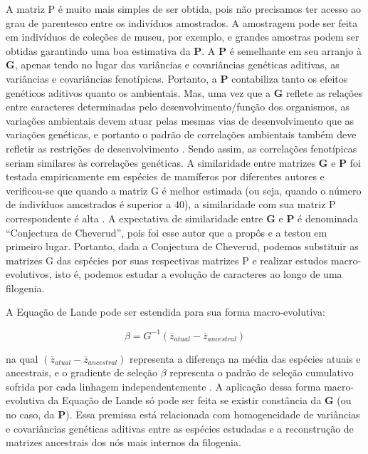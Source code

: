 \documentclass[portuges,]{tufte-handout}
\begin{document}
A matriz P é muito mais simples de ser obtida, pois não precisamos ter
acesso ao grau de parentesco entre os indivíduos amostrados. A
amostragem pode ser feita em indivíduos de coleções de museu, por
exemplo, e grandes amostras podem ser obtidas garantindo uma boa
estimativa da $\mathbf{P}$. A $\mathbf{P}$ é semelhante em seu arranjo à
$\mathbf{G}$, apenas tendo no lugar das variâncias e covariâncias
genéticas aditivas, as variâncias e covariâncias fenotípicas. Portanto,
a $\mathbf{P}$ contabiliza tanto os efeitos genéticos aditivos quanto os
ambientais. Mas, uma vez que a $\mathbf{G}$ reflete as relações entre
caracteres determinadas pelo desenvolvimento/função dos organismos, as
variações ambientais devem atuar pelas mesmas vias de desenvolvimento
que as variações genéticas, e portanto o padrão de correlações
ambientais também deve refletir as restrições de desenvolvimento
\cite{Cheverud1984}. Sendo assim, as correlações fenotípicas seriam
similares às correlações genéticas. A similaridade entre matrizes
$\mathbf{G}$ e $\mathbf{P}$ foi testada empiricamente em espécies de
mamíferos por diferentes autores e verificou-se que quando a matriz G é
melhor estimada (ou seja, quando o número de indivíduos amostrados é
superior a 40), a similaridade com sua matriz P correspondente é alta
\cite{Cheverud1988}. A expectativa de similaridade entre
$\mathbf{G}$ e $\mathbf{P}$ é denominada ``Conjectura de Cheverud'',
pois foi esse autor que a propôs e a testou em primeiro lugar. Portanto,
dada a Conjectura de Cheverud, podemos substituir as matrizes G das
espécies por suas respectivas matrizes P e realizar estudos
macro-evolutivos, isto é, podemos estudar a evolução de caracteres ao
longo de uma filogenia.

A Equação de Lande pode ser estendida para sua forma macro-evolutiva:

\[
\beta = G^{-1} (\overline z_{atual} - \overline z_{ancestral})
\]

na qual $(\overline z_{atual} - \overline z_{ancestral})$ representa a
diferença na média das espécies atuais e ancestrais, e o gradiente de
seleção $\beta$ representa o padrão de seleção cumulativo sofrida por
cada linhagem independentemente \cite{Marroig2005}. A aplicação
dessa forma macro-evolutiva da Equação de Lande só pode ser feita se
existir constância da $\mathbf{G}$ (ou no caso, da $\mathbf{P}$). Essa
premissa está relacionada com homogeneidade de variâncias e covariâncias
genéticas aditivas entre as espécies estudadas e a reconstrução de
matrizes ancestrais dos nós mais internos da filogenia.
\end{document}
